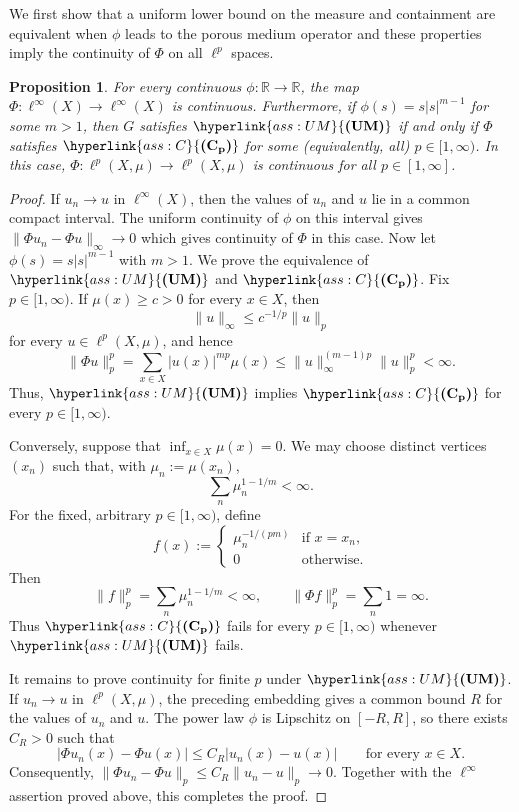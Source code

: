 \documentclass[letterpaper]{article}
\newtheorem{proposition}[lemma]{Proposition}
\theoremstyle{definition}
\theoremstyle{named}
\numberwithin{equation}{section}
\newcommand{\UM}{\hyperlink{ass:UM}{\textup{\textbf{(UM)}}}}
\newcommand{\Cp}{\hyperlink{ass:C}{\textup{\textbf{(C\textsubscript{p})}}}}
\newcommand{\R}{\mathbb{R}}
\begin{document}
We first show that a uniform lower bound on the measure 
and containment are equivalent when $\phi$ leads to the porous medium
operator and these properties imply
the continuity of $\Phi$ on all $\ell^p$ spaces.
\begin{proposition}\label{p:PME_measure}
{
For every continuous $\phi\colon\R\to\R$, the map
$\Phi\colon \ell^\infty(X) \to \ell^\infty(X)$ is continuous.
Furthermore, if $\phi(s)=s|s|^{m-1}$ for some $m>1$,
then $G$ satisfies $\UM$}
if and only if $\Phi$ satisfies $\Cp$ for some (equivalently, all) $p \in [1,\infty)$. In this case, 
$\Phi\colon \ell^p(X,\mu) \to \ell^p(X,\mu)$ is continuous for all $p \in [1,\infty]$.
\end{proposition}
\begin{proof}
{
If $u_n\to u$ in $\ell^\infty(X)$, then the values of $u_n$ and $u$ lie in a common compact interval. 
The uniform continuity of $\phi$ on this interval gives
$\|\Phi u_n-\Phi u\|_\infty\to0$ which gives continuity of $\Phi$ in this case.
Now let $\phi(s)=s|s|^{m-1}$ with $m>1$. We prove the equivalence of
$\UM$ and $\Cp$. Fix $p\in[1,\infty)$. If $\mu(x)\geq c>0$ for every
$x\in X$, then
\[
 \|u\|_\infty\leq c^{-1/p}\|u\|_p
\]
for every $u\in\ell^p(X,\mu)$, and hence
\[
 \|\Phi u\|_p^p
 =\sum_{x\in X}|u(x)|^{mp}\mu(x)
 \leq\|u\|_\infty^{(m-1)p}\|u\|_p^p<\infty.
\]
Thus, $\UM$ implies $\Cp$ for every $p \in [1,\infty)$.

Conversely, suppose that $\inf_{x\in X}\mu(x)=0$. We may choose distinct
vertices $(x_n)$ such that, with $\mu_n:=\mu(x_n)$,
\[
 \sum_n\mu_n^{1-1/m}<\infty.
\]
For the fixed, arbitrary $p\in[1,\infty)$, define
\[
 f(x):=
 \begin{cases}
  \mu_n^{-1/(pm)}&\text{if }x=x_n,\\
  0&\text{otherwise}.
 \end{cases}
\]
Then
\[
 \|f\|_p^p=\sum_n\mu_n^{1-1/m}<\infty,
 \qquad
 \|\Phi f\|_p^p=\sum_n1=\infty.
\]
Thus $\Cp$ fails for every $p\in[1,\infty)$ whenever $\UM$ fails.

It remains to prove continuity for finite $p$ under $\UM$. If
$u_n\to u$ in $\ell^p(X,\mu)$, the preceding embedding gives a common
bound $R$ for the values of $u_n$ and $u$. The power law $\phi$ is
Lipschitz on $[-R,R]$, so there exists $C_R>0$ such that
\[
 |\Phi u_n(x)-\Phi u(x)|\leq C_R|u_n(x)-u(x)|
 \qquad\text{for every }x\in X.
\]
Consequently,
$\|\Phi u_n-\Phi u\|_p\leq C_R\|u_n-u\|_p\to0$. Together with the
$\ell^\infty$ assertion proved above, this completes the proof.
}
\end{proof}
\end{document}
